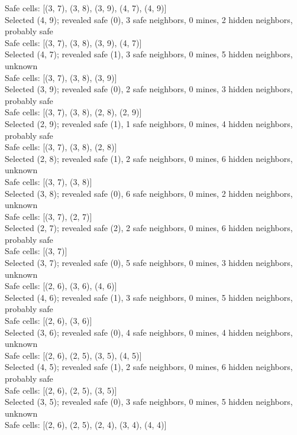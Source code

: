 \documentclass[11pt]{article} %
\begin{document}
Safe cells: [(3, 7), (3, 8), (3, 9), (4, 7), (4, 9)]\\
Selected (4, 9); revealed safe (0), 3 safe neighbors, 0 mines, 2 hidden neighbors, probably safe\\
Safe cells: [(3, 7), (3, 8), (3, 9), (4, 7)]\\
Selected (4, 7); revealed safe (1), 3 safe neighbors, 0 mines, 5 hidden neighbors, unknown\\
Safe cells: [(3, 7), (3, 8), (3, 9)]\\
Selected (3, 9); revealed safe (0), 2 safe neighbors, 0 mines, 3 hidden neighbors, probably safe\\
Safe cells: [(3, 7), (3, 8), (2, 8), (2, 9)]\\
Selected (2, 9); revealed safe (1), 1 safe neighbors, 0 mines, 4 hidden neighbors, probably safe\\
Safe cells: [(3, 7), (3, 8), (2, 8)]\\
Selected (2, 8); revealed safe (1), 2 safe neighbors, 0 mines, 6 hidden neighbors, unknown\\
Safe cells: [(3, 7), (3, 8)]\\
Selected (3, 8); revealed safe (0), 6 safe neighbors, 0 mines, 2 hidden neighbors, unknown\\
Safe cells: [(3, 7), (2, 7)]\\
Selected (2, 7); revealed safe (2), 2 safe neighbors, 0 mines, 6 hidden neighbors, probably safe\\
Safe cells: [(3, 7)]\\
Selected (3, 7); revealed safe (0), 5 safe neighbors, 0 mines, 3 hidden neighbors, unknown\\
Safe cells: [(2, 6), (3, 6), (4, 6)]\\
Selected (4, 6); revealed safe (1), 3 safe neighbors, 0 mines, 5 hidden neighbors, probably safe\\
Safe cells: [(2, 6), (3, 6)]\\
Selected (3, 6); revealed safe (0), 4 safe neighbors, 0 mines, 4 hidden neighbors, unknown\\
Safe cells: [(2, 6), (2, 5), (3, 5), (4, 5)]\\
Selected (4, 5); revealed safe (1), 2 safe neighbors, 0 mines, 6 hidden neighbors, probably safe\\
Safe cells: [(2, 6), (2, 5), (3, 5)]\\
Selected (3, 5); revealed safe (0), 3 safe neighbors, 0 mines, 5 hidden neighbors, unknown\\
Safe cells: [(2, 6), (2, 5), (2, 4), (3, 4), (4, 4)]\\
\end{document}
